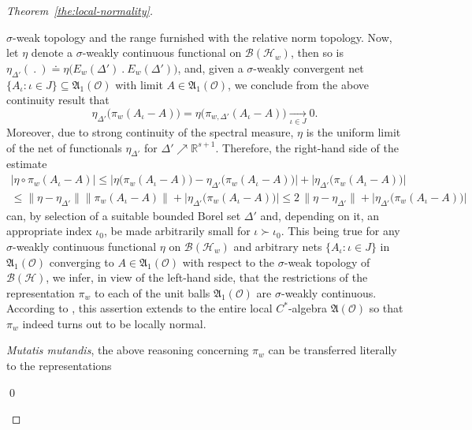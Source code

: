 \documentclass[a4paper,a4paper]{article}
\numberwithin{equation}{section}
\newcommand{\Rsone}{\mathbb{R}^{s + 1}}
\newcommand{\BH}{\mathscr{B} ( \mathscr{H} )}
\newcommand{\BHw}{\mathscr{B} ( \mathscr{H}_w )}
\newcommand{\EwDprime}{E_w ( \Delta' )}
\newcommand{\AO}{\mathfrak{A} ( \mathscr{O} )}
\newcommand{\AoneO}{\mathfrak{A}_1 ( \mathscr{O} )}
\newcommand{\piwDprime}{\pi_{w , \Delta'}}
\newcommand{\etaDprime}{\eta_{\Delta'}}
\newcounter{proofitem}
\newenvironment{prooflist}{\begin{list}{(\roman{proofitem})}%
  {\usecounter{proofitem} \setlength{\topsep}{0ex}%
   \setlength{\parsep}{0.2ex} \setlength{\itemsep}{0.4ex}%
   \setlength{\leftmargin}{0em} \setlength{\itemindent}{0.5em}%
   \setlength{\listparindent}{1em}}}{\qed \end{list}}
\theoremstyle{definition}
\theoremstyle{plain}
\theoremstyle{remark}
\theoremstyle{assumption}
\newcommand{\bset}[1]{\bigl\{ #1 \bigr\}}
\newcommand{\babs}[1]{\bigl\lvert #1 \bigr\rvert}
\newcommand{\bnorm}[1]{\bigl\lVert #1 \bigr\rVert}
\begin{document}
\begin{proof}[Theorem~\ref{the:local-normality}]
\begin{prooflist}
      $\sigma$-weak topology and the range furnished with the relative
      norm topology. Now, let $\eta$ denote a $\sigma$-weakly
      continuous functional on $\BHw$, then so is $\etaDprime (~.~)
      \doteq \eta \bigl( \EwDprime~.~\EwDprime \bigr)$, and, given a
      $\sigma$-weakly convergent net $\bset{A_\iota : \iota \in J}
      \subseteq \AoneO$ with limit $A \in \AoneO$, we conclude from
      the above continuity result that
      \begin{equation}
        \label{eq:sigma-weak-Delta-limit}
        \etaDprime \bigl( \pi_w ( A_\iota - A ) \bigr) = \eta \bigl(
        \piwDprime ( A_\iota - A ) \bigr) \xrightarrow[\iota \in J]{}
        0 \text{.}
      \end{equation}
      Moreover, due to strong continuity of the spectral measure,
      $\eta$ is the uniform limit of the net of functionals
      $\etaDprime$ for $\Delta' \nearrow \Rsone$. Therefore, the
      right-hand side of the estimate
      \begin{multline}
        \label{eq:sigma-weak-limit}
        \babs{\eta \circ \pi_w ( A_\iota - A )} \leqslant \babs{\eta
        \bigl( \pi_w ( A_\iota - A ) \bigr) - \etaDprime \bigl( \pi_w
        ( A_\iota - A ) \bigr)} + \babs{\etaDprime \bigl( \pi_w (
        A_\iota - A ) \bigr)} \\
        \leqslant \bnorm{\eta - \etaDprime} \bnorm{\pi_w ( A_\iota - A
        )} + \babs{\etaDprime \bigl( \pi_w ( A_\iota - A ) \bigr)}
        \leqslant 2 \, \bnorm{\eta - \etaDprime} + \babs{\etaDprime
        \bigl( \pi_w ( A_\iota - A ) \bigr)}
      \end{multline}
      can, by selection of a suitable bounded Borel set $\Delta'$ and,
      depending on it, an appropriate index $\iota_0$, be made
      arbitrarily small for $\iota \succ \iota_0$. This being true for
      any $\sigma$-weakly continuous functional $\eta$ on $\BHw$ and
      arbitrary nets $\bset{A_\iota : \iota \in J}$ in $\AoneO$
      converging to $A \in \AoneO$ with respect to the $\sigma$-weak
      topology of $\BH$, we infer, in view of the left-hand side, that
      the restrictions of the representation $\pi_w$ to each of the
      unit balls $\AoneO$ are $\sigma$-weakly continuous. According to
      \cite[Lemma~10.1.10]{kadison/ringrose:1986}, this assertion
      extends to the entire local $C^*$-algebra $\AO$ so that $\pi_w$
      indeed turns out to be locally normal.
    \item \emph{Mutatis mutandis}, the above reasoning concerning
      $\pi_w$ can be transferred literally to the representations

\end{prooflist}
\end{proof}
\end{document}
